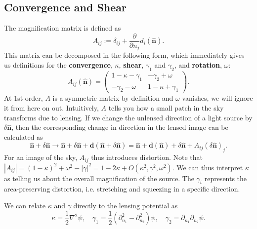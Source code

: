 \documentclass[11pt]{article} %
\begin{document}
\subsection{Convergence and Shear}
The magnification matrix is defined as
\begin{equation}
    A_{ij} := \delta_{ij} + \frac{\partial}{\partial n_j}d_i(\hat{\mathbf n}).
\end{equation}
This matrix can be decomposed in the following form, which immediately gives us definitions for the \textbf{convergence}, $\kappa$, \textbf{shear}, $\gamma_1$ and $\gamma_2$, and \textbf{rotation}, $\omega$:
\begin{equation}
    A_{ij}(\hat{\mathbf n}) = \begin{pmatrix}
        1 - \kappa - \gamma_1 & -\gamma_2 + \omega \\
        -\gamma_2 - \omega & 1 - \kappa + \gamma_1
    \end{pmatrix}.
\end{equation}
At 1st order, $A$ is a symmetric matrix by definition and $\omega$ vanishes, we will ignore it from here on out. Intuitively, $A$ tells you how a small patch in the sky transforms due to lensing. If we change the unlensed direction of a light source by $\delta\hat{\mathbf n}$, then the corresponding change in direction in the lensed image can be calculated as
\begin{equation}
\hat{\mathbf{n}} + \delta \hat{\mathbf{n}} \rightarrow \hat{\mathbf{n}} + \delta \hat{\mathbf{n}} + \mathbf d (\hat{\mathbf{n}} + \delta \hat{\mathbf{n}}) = \hat{\mathbf{n}} + \mathbf d (\hat{\mathbf n}) + \delta \hat{\mathbf n} + A_{ij}(\delta \hat{\mathbf{n}})_j.
\end{equation}
For an image of the sky, $A_{ij}$ thus introduces distortion. Note that $|A_{ij}| = (1 - \kappa)^2 + \omega^2 - |\gamma|^2 = 1 - 2\kappa + O(\kappa^2, \gamma^2, \omega^2)$. We can thus interpret $\kappa$ as telling us about the overall magnification of the source. The $\gamma_i$ represents the area-preserving distortion, i.e. stretching and squeezing in a specific direction.

We can relate $\kappa$ and $\gamma$ directly to the lensing potential as
\begin{equation}
    \kappa = \frac{1}{2}\nabla^2\psi, \quad \gamma_1 = \frac{1}{2}(\partial_{n_1}^2 - \partial_{n_2}^2)\psi, \quad \gamma_2 = \partial_{n_1}\partial_{n_2} \psi.
\end{equation}
\end{document}

